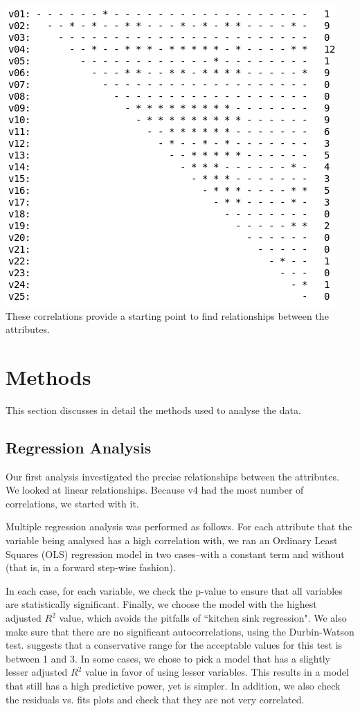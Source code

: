 \documentclass[12pt,a4paper,twocolumn]{article}
\begin{document}
\includegraphics[scale=0.4]{fig1.png}
\begingroup
{}
\endgroup
\hfill\break
These correlations provide a starting point to find relationships between the attributes.

\section{Methods}
This section discusses in detail the methods used to analyse the data.

\subsection{Regression Analysis}
Our first analysis investigated the precise relationships between the attributes. We looked at linear relationships. Because v4 had the most number of correlations, we started with it.

Multiple regression analysis was performed as follows. For each attribute that the variable being analysed has a high correlation with, we ran an Ordinary Least Squares (OLS) regression model in two cases--with a constant term and without (that is, in a forward step-wise fashion). 

In each case, for each variable, we check the p-value to ensure that all variables are statistically significant. Finally, we choose the model with the highest adjusted $R^2$ value, which avoids the pitfalls of ``kitchen sink regression". We also make sure that there are no significant autocorrelations, using the Durbin-Watson test. \cite{field2009discovering} suggests that a conservative range for the acceptable values for this test is between 1 and 3. In some cases, we chose to pick a model that has a slightly lesser adjusted $R^2$ value in favor of using lesser variables. This results in a model that still has a high predictive power, yet is simpler. In addition, we also check the residuals vs. fits plots and check that they are not very correlated.
\end{document}
